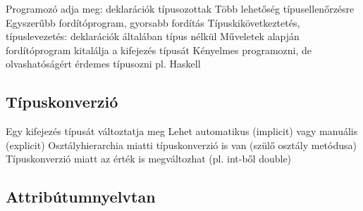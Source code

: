 \documentclass[12pt,a4paper]{article}
\begin{document}
\begin{outline}
	\1 Programozó adja meg: deklarációk típusozottak
		\2 Több lehetőség típusellenőrzésre
		\2 Egyszerűbb fordítóprogram, gyorsabb fordítás
	\1 Típuskikövetkeztetés, típuslevezetés: deklarációk általában típus nélkül
		\2 Műveletek alapján fordítóprogram kitalálja a kifejezés típusát
		\2 Kényelmes programozni, de olvashatóságért érdemes típusozni
		\2 pl. Haskell
\end{outline}

\subsection{Típuskonverzió}

\begin{outline}
	\1 Egy kifejezés típusát változtatja meg
	\1 Lehet automatikus (implicit) vagy manuális (explicit)
	\1 Osztályhierarchia miatti típuskonverzió is van (szülő osztály metódusa)
	\1 Típuskonverzió miatt az érték is megváltozhat (pl. int-ből double)
\end{outline}

\pagebreak

\subsection{Attribútumnyelvtan}
\end{document}
